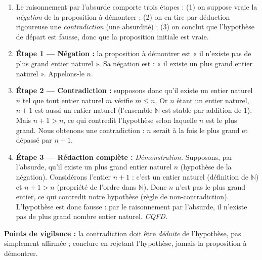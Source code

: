 \documentclass[11pt]{article}
\begin{document}
\begin{corrige}
\begin{enumerate}
\item Le raisonnement par l'absurde comporte trois étapes : (1) on suppose vraie la \emph{négation} de la proposition à démontrer ; (2) on en tire par déduction rigoureuse une \emph{contradiction} (une absurdité) ; (3) on conclut que l'hypothèse de départ est fausse, donc que la proposition initiale est vraie.
\item \textbf{Étape 1 — Négation :} la proposition à démontrer est « il n'existe pas de plus grand entier naturel ». Sa négation est : « il existe un plus grand entier naturel ». Appelons-le $n$.
\item \textbf{Étape 2 — Contradiction :} supposons donc qu'il existe un entier naturel $n$ tel que tout entier naturel $m$ vérifie $m \leq n$. Or $n$ étant un entier naturel, $n+1$ est aussi un entier naturel (l'ensemble $\mathbb{N}$ est stable par addition de 1). Mais $n+1 > n$, ce qui contredit l'hypothèse selon laquelle $n$ est le plus grand. Nous obtenons une contradiction : $n$ serait à la fois le plus grand et dépassé par $n+1$.
\item \textbf{Étape 3 — Rédaction complète :} \emph{Démonstration.} Supposons, par l'absurde, qu'il existe un plus grand entier naturel $n$ (hypothèse de la négation). Considérons l'entier $n+1$ : c'est un entier naturel (définition de $\mathbb{N}$) et $n+1 > n$ (propriété de l'ordre dans $\mathbb{N}$). Donc $n$ n'est pas le plus grand entier, ce qui contredit notre hypothèse (règle de non-contradiction). L'hypothèse est donc fausse : par le raisonnement par l'absurde, il n'existe pas de plus grand nombre entier naturel. \emph{CQFD.}
\end{enumerate}
\textbf{Points de vigilance :} la contradiction doit être \emph{déduite} de l'hypothèse, pas simplement affirmée ; conclure en rejetant l'hypothèse, jamais la proposition à démontrer.
\end{corrige}
\end{document}
